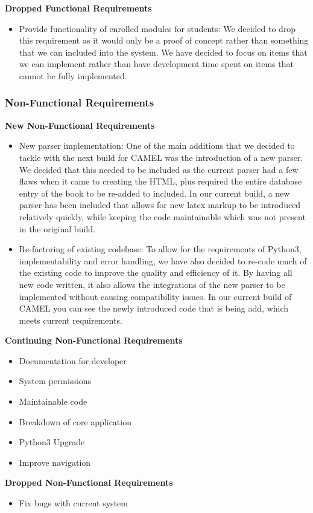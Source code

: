 	\textbf{Dropped Functional Requirements}
	\begin{itemize}
		\item Provide functionality of enrolled modules for students: We decided to drop this requirement as it would only be a proof of concept rather than something that we can included into the system. We have decided to focus on items that we can implement rather than have development time spent on items that cannot be fully implemented.  
	\end{itemize}
		
	\subsubsection{Non-Functional Requirements}
	\textbf{New Non-Functional Requirements}
	\begin{itemize}
		\item New parser implementation: One of the main additions that we decided to tackle with the next build for CAMEL was the introduction of a new parser. We decided that this needed to be included as the current parser had a few flaws when it came to creating the HTML, plus required the entire database entry of the book to be re-added to included. In our current build, a new parser has been included that allows for new latex markup to be introduced relatively quickly, while keeping the code maintainable which was not present in the original build.    
		\item Re-factoring of existing codebase: To allow for the requirements of Python3, implementability and error handling, we have also decided to re-code much of the existing code to improve the quality and efficiency of it. By having all new code written, it also allows the integrations of the new parser to be implemented without causing compatibility issues. In our current build of CAMEL you can see the newly introduced code that is being add, which meets current requirements.  
	\end{itemize}
	
	\textbf{Continuing Non-Functional Requirements}
	\begin{itemize}
		\item Documentation for developer
		\item System permissions
		\item Maintainable code
		\item Breakdown of core application
		\item Python3 Upgrade
		\item Improve navigation
	\end{itemize}
	
	\textbf{Dropped Non-Functional Requirements}
	\begin{itemize}
		\item Fix bugs with current system	
	\end{itemize}
	
